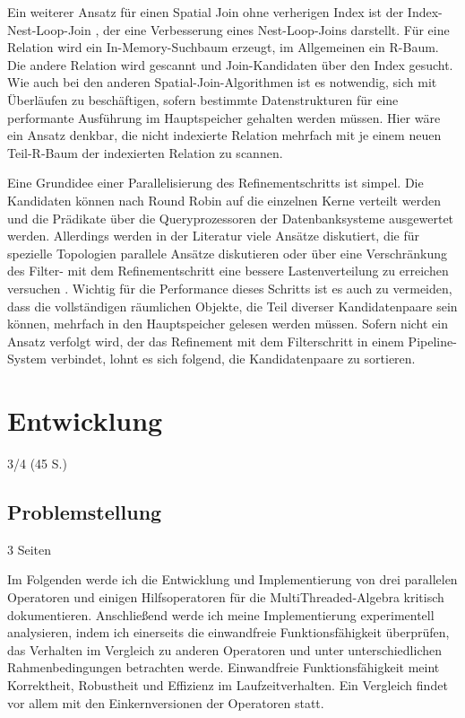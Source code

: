 \documentclass[a4paper,12pt,twoside]{article}
\begin{document}
{Ein weiterer Ansatz für einen Spatial Join ohne verherigen Index ist der Index-Nest-Loop-Join \parencite[S. 10f]{Jacox2007}, der eine Verbesserung eines Nest-Loop-Joins 
darstellt. Für eine Relation wird ein In-Memory-Suchbaum erzeugt, im Allgemeinen ein R-Baum. Die andere Relation wird gescannt und Join-Kandidaten über den Index gesucht. Wie auch bei den anderen Spatial-Join-Algorithmen ist es notwendig, sich mit Überläufen zu beschäftigen, sofern bestimmte Datenstrukturen für eine performante Ausführung im Hauptspeicher gehalten werden müssen. Hier wäre ein Ansatz denkbar, die nicht indexierte Relation mehrfach mit je einem neuen Teil-R-Baum der indexierten Relation zu scannen. 

Eine Grundidee einer Parallelisierung des Refinementschritts ist simpel. Die Kandidaten können nach Round Robin auf die einzelnen Kerne verteilt werden und die Prädikate über die Queryprozessoren der Datenbanksysteme ausgewertet werden. Allerdings werden in der Literatur viele Ansätze diskutiert, die für spezielle Topologien parallele Ansätze diskutieren \parencite{Bouros2019, Rigaux2001} oder über eine Verschränkung des Filter- mit dem Refinementschritt eine bessere Lastenverteilung zu erreichen versuchen \parencite{Brinkhoff1996, Jacox2007, Zhou1998}. Wichtig für die Performance dieses Schritts ist es auch zu vermeiden, dass die vollständigen räumlichen Objekte, die Teil diverser Kandidatenpaare sein können, mehrfach in den Hauptspeicher gelesen werden müssen. Sofern nicht ein Ansatz verfolgt wird, der das Refinement mit dem Filterschritt in einem Pipeline-System verbindet, lohnt es sich {\textcite[ S. 45f]{Jacox2007}} folgend, die Kandidatenpaare zu sortieren.

\section{Entwicklung}
3/4 (45 S.)

\subsection{Problemstellung} 3 Seiten
\label{problem}

Im Folgenden werde ich die Entwicklung und Implementierung von drei parallelen Operatoren und einigen Hilfsoperatoren für die MultiThreaded-Algebra kritisch dokumentieren. Anschließend werde ich meine Implementierung experimentell analysieren, indem ich einerseits die einwandfreie Funktionsfähigkeit überprüfen, das Verhalten im Vergleich zu anderen Operatoren und unter unterschiedlichen Rahmenbedingungen betrachten werde. Einwandfreie Funktionsfähigkeit meint Korrektheit, Robustheit und Effizienz im Laufzeitverhalten. Ein Vergleich findet vor allem mit den Einkernversionen der Operatoren statt.

}
\end{document}
